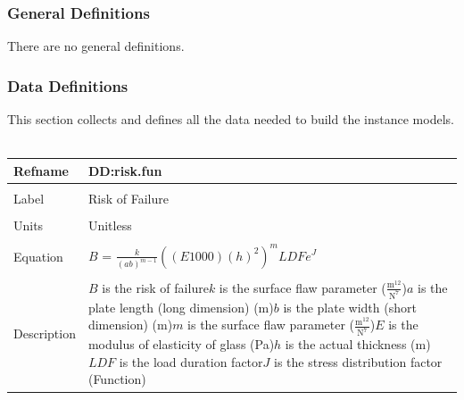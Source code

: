 \documentclass[12pt]{article}
\begin{document}
\subsubsection{General Definitions}
\label{Sec:GeneDefi}
There are no general definitions.
\subsubsection{Data Definitions}
\label{Sec:DataDefi}
This section collects and defines all the data needed to build the instance models.
~\newline
\noindent \begin{minipage}{\textwidth}
\begin{tabular}{p{} p{}}
\toprule \textbf{Refname} & \textbf{DD:risk.fun}
\label{DD:risk.fun}
\\ \midrule \\
Label & Risk of Failure
\\ \midrule \\
Units & Unitless
\\ \midrule \\
Equation & $B$ = $\frac{k}{\left(a b\right)^{m-1}} \left(\left(E 1000\right) \left(h\right)^{2}\right)^{m} LDF e^{J}$
\\ \midrule \\
Description & $B$ is the risk of failure\newline$k$ is the surface flaw parameter ($\frac{\text{m}^{12}}{\text{N}^{7}}$)\newline$a$ is the plate length (long dimension) (m)\newline$b$ is the plate width (short dimension) (m)\newline$m$ is the surface flaw parameter ($\frac{\text{m}^{12}}{\text{N}^{7}}$)\newline$E$ is the modulus of elasticity of glass (Pa)\newline$h$ is the actual thickness (m)\newline$LDF$ is the load duration factor\newline$J$ is the stress distribution factor (Function)
\\ \bottomrule \end{tabular}
\end{minipage}\\
~\newline
\end{document}
